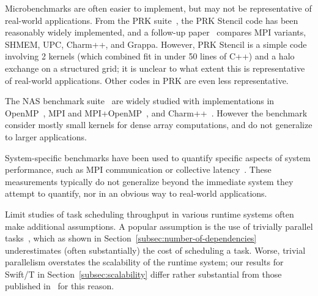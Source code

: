 Microbenchmarks are often easier to implement, but may not be
representative of real-world applications. From the PRK
suite~\cite{PRK14}, the PRK Stencil code has been reasonably widely
implemented, and a follow-up paper~\cite{PRKRuntimes16} compares MPI
variants, SHMEM, UPC, Charm++, and Grappa. However, PRK Stencil is a
simple code involving 2 kernels (which combined fit in under 50 lines
of C++) and a halo exchange on a structured grid; it is unclear to
what extent this is representative of real-world applications. Other
codes in PRK are even less representative.

The NAS benchmark suite~\cite{NAS91, NAS95} are widely studied with
implementations in OpenMP~\cite{NASOpenMP99}, MPI and
MPI+OpenMP~\cite{NASMPIOpenMP00}, and
Charm++~\cite{NASCharm96}. However the benchmark consider mostly small
kernels for dense array computations, and do not generalize to larger
applications.

System-specific benchmarks have been used to quantify specific aspects
of system performance, such as MPI communication or collective
latency~\cite{MPPTest99, MPIBench01}. These measurements typically do
not generalize beyond the immediate system they attempt to quantify,
nor in an obvious way to real-world applications.

Limit studies of task scheduling throughput in various runtime systems
often make additional assumptions. A popular assumption is the use of
trivially parallel tasks~\cite{Canary16, Armstrong14}, which as shown
in Section~\ref{subsec:number-of-dependencies} underestimates (often
substantially) the cost of scheduling a task. Worse, trivial
parallelism overstates the scalability of the runtime system; our
results for Swift/T in Section~\ref{subsec:scalability} differ rather
substantial from those published in~\cite{Armstrong14} for this
reason.
